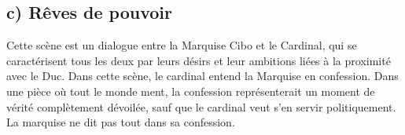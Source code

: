 \documentclass[12pt]{article}
\begin{document}
\subsection*{c) Rêves de pouvoir}
Cette scène est un dialogue entre la Marquise Cibo et le Cardinal, qui se caractérisent tous les deux par leurs désirs et leur ambitions liées à la proximité avec le Duc.
Dans cette scène, le cardinal entend la Marquise en confession. Dans une pièce où tout le monde ment, la confession représenterait un moment de vérité complètement dévoilée, sauf que le cardinal veut s'en servir politiquement.
La marquise ne dit pas tout dans sa confession.
\end{document}

